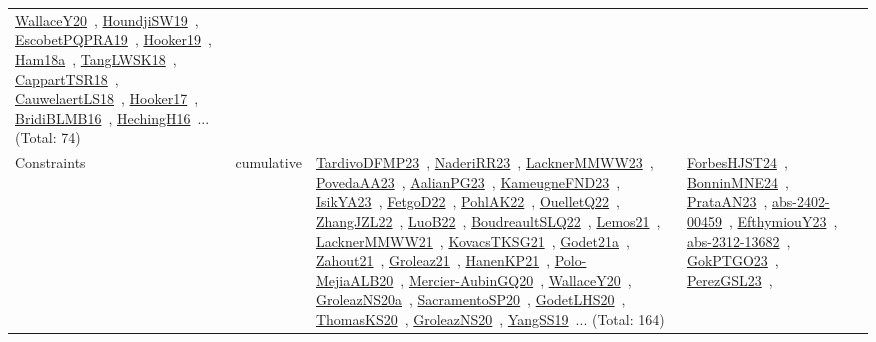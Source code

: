 {\begin{longtable}{lp{3cm}>{\raggedright\arraybackslash}p{6cm}>{\raggedright\arraybackslash}p{6cm}>{\raggedright\arraybackslash}p{8cm}}
\href{../works/WallaceY20.pdf}{WallaceY20}~\cite{WallaceY20}, \href{../works/HoundjiSW19.pdf}{HoundjiSW19}~\cite{HoundjiSW19}, \href{../works/EscobetPQPRA19.pdf}{EscobetPQPRA19}~\cite{EscobetPQPRA19}, \href{../works/Hooker19.pdf}{Hooker19}~\cite{Hooker19}, \href{../works/Ham18a.pdf}{Ham18a}~\cite{Ham18a}, \href{../works/TangLWSK18.pdf}{TangLWSK18}~\cite{TangLWSK18}, \href{../works/CappartTSR18.pdf}{CappartTSR18}~\cite{CappartTSR18}, \href{../works/CauwelaertLS18.pdf}{CauwelaertLS18}~\cite{CauwelaertLS18}, \href{../works/Hooker17.pdf}{Hooker17}~\cite{Hooker17}, \href{../works/BridiBLMB16.pdf}{BridiBLMB16}~\cite{BridiBLMB16}, \href{../works/HechingH16.pdf}{HechingH16}~\cite{HechingH16}... (Total: 74)\\
Constraints & cumulative & \href{../works/TardivoDFMP23.pdf}{TardivoDFMP23}~\cite{TardivoDFMP23}, \href{../works/NaderiRR23.pdf}{NaderiRR23}~\cite{NaderiRR23}, \href{../works/LacknerMMWW23.pdf}{LacknerMMWW23}~\cite{LacknerMMWW23}, \href{../works/PovedaAA23.pdf}{PovedaAA23}~\cite{PovedaAA23}, \href{../works/AalianPG23.pdf}{AalianPG23}~\cite{AalianPG23}, \href{../works/KameugneFND23.pdf}{KameugneFND23}~\cite{KameugneFND23}, \href{../works/IsikYA23.pdf}{IsikYA23}~\cite{IsikYA23}, \href{../works/FetgoD22.pdf}{FetgoD22}~\cite{FetgoD22}, \href{../works/PohlAK22.pdf}{PohlAK22}~\cite{PohlAK22}, \href{../works/OuelletQ22.pdf}{OuelletQ22}~\cite{OuelletQ22}, \href{../works/ZhangJZL22.pdf}{ZhangJZL22}~\cite{ZhangJZL22}, \href{../works/LuoB22.pdf}{LuoB22}~\cite{LuoB22}, \href{../works/BoudreaultSLQ22.pdf}{BoudreaultSLQ22}~\cite{BoudreaultSLQ22}, \href{../works/Lemos21.pdf}{Lemos21}~\cite{Lemos21}, \href{../works/LacknerMMWW21.pdf}{LacknerMMWW21}~\cite{LacknerMMWW21}, \href{../works/KovacsTKSG21.pdf}{KovacsTKSG21}~\cite{KovacsTKSG21}, \href{../works/Godet21a.pdf}{Godet21a}~\cite{Godet21a}, \href{../works/Zahout21.pdf}{Zahout21}~\cite{Zahout21}, \href{../works/Groleaz21.pdf}{Groleaz21}~\cite{Groleaz21}, \href{../works/HanenKP21.pdf}{HanenKP21}~\cite{HanenKP21}, \href{../works/Polo-MejiaALB20.pdf}{Polo-MejiaALB20}~\cite{Polo-MejiaALB20}, \href{../works/Mercier-AubinGQ20.pdf}{Mercier-AubinGQ20}~\cite{Mercier-AubinGQ20}, \href{../works/WallaceY20.pdf}{WallaceY20}~\cite{WallaceY20}, \href{../works/GroleazNS20a.pdf}{GroleazNS20a}~\cite{GroleazNS20a}, \href{../works/SacramentoSP20.pdf}{SacramentoSP20}~\cite{SacramentoSP20}, \href{../works/GodetLHS20.pdf}{GodetLHS20}~\cite{GodetLHS20}, \href{../works/ThomasKS20.pdf}{ThomasKS20}~\cite{ThomasKS20}, \href{../works/GroleazNS20.pdf}{GroleazNS20}~\cite{GroleazNS20}, \href{../works/YangSS19.pdf}{YangSS19}~\cite{YangSS19}... (Total: 164) & \href{../works/ForbesHJST24.pdf}{ForbesHJST24}~\cite{ForbesHJST24}, \href{../works/BonninMNE24.pdf}{BonninMNE24}~\cite{BonninMNE24}, \href{../works/PrataAN23.pdf}{PrataAN23}~\cite{PrataAN23}, \href{../works/abs-2402-00459.pdf}{abs-2402-00459}~\cite{abs-2402-00459}, \href{../works/EfthymiouY23.pdf}{EfthymiouY23}~\cite{EfthymiouY23}, \href{../works/abs-2312-13682.pdf}{abs-2312-13682}~\cite{abs-2312-13682}, \href{../works/GokPTGO23.pdf}{GokPTGO23}~\cite{GokPTGO23}, \href{../works/PerezGSL23.pdf}{PerezGSL23}~\cite{PerezGSL23}, 
\end{longtable}}
